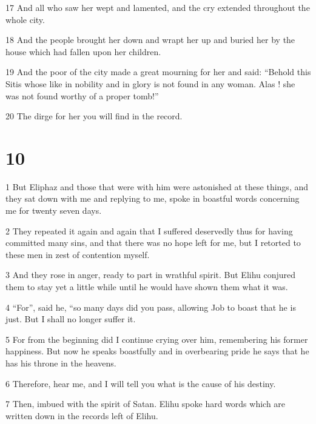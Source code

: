 \par 17 And all who saw her wept and lamented, and the cry extended throughout the whole city.

\par 18 And the people brought her down and wrapt her up and buried her by the house which had fallen upon her children.

\par 19 And the poor of the city made a great mourning for her and said: “Behold this Sitis whose like in nobility and in glory is not found in any woman. Alas ! she was not found worthy of a proper tomb!”

\par 20 The dirge for her you will find in the record.

\chapter{10}

\par 1 But Eliphaz and those that were with him were astonished at these things, and they sat down with me and replying to me, spoke in boastful words concerning me for twenty seven days.

\par 2 They repeated it again and again that I suffered deservedly thus for having committed many sins, and that there was no hope left for me, but I retorted to these men in zest of contention myself.

\par 3 And they rose in anger, ready to part in wrathful spirit. But Elihu conjured them to stay yet a little while until he would have shown them what it was.

\par 4 “For”, said he, “so many days did you pass, allowing Job to boast that he is just. But I shall no longer suffer it.

\par 5 For from the beginning did I continue crying over him, remembering his former happiness. But now he speaks boastfully and in overbearing pride he says that he has his throne in the heavens.

\par 6 Therefore, hear me, and I will tell you what is the cause of his destiny.

\par 7 Then, imbued with the spirit of Satan. Elihu spoke hard words which are written down in the records left of Elihu.

